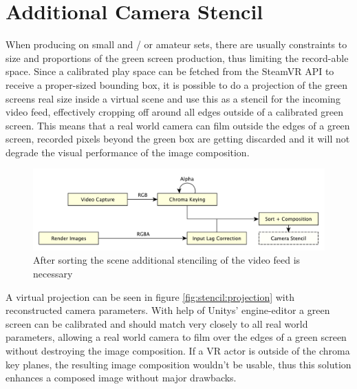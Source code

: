 %
\section{Additional Camera Stencil}

When producing on small and / or amateur sets, there are usually constraints to 
size and proportions of the green screen production, thus limiting the 
record-able space. Since a calibrated play space can be fetched from the 
SteamVR API to receive a proper-sized bounding box, it is possible to do a 
projection of the green screens real size inside a virtual scene and use this 
as a stencil for the incoming video feed, effectively cropping off around all 
edges outside of a calibrated green screen. This means that a real world camera 
can film outside the edges of a green screen, recorded pixels beyond the green 
box are getting discarded and it will not degrade the visual performance of the 
image composition.

\begin{figure}[htb]
	\includegraphics[width=\textwidth]{_raw_resources/pipeline_steps/4_6_stencil.pdf}
	\caption{After sorting the scene additional stenciling of the video feed is 
	necessary}
	\label{fig:steps:stencil}
\end{figure}

A virtual projection can be seen in figure \ref{fig:stencil:projection} with 
reconstructed camera parameters. With help of Unitys' engine-editor a 
green screen can be calibrated and should match very closely to all real world 
parameters, allowing a real world camera to film over the edges of a 
green screen without destroying the image composition. If a VR actor is outside 
of the chroma key planes, the resulting image composition wouldn't be usable, 
thus this solution enhances a composed image without major drawbacks. 

